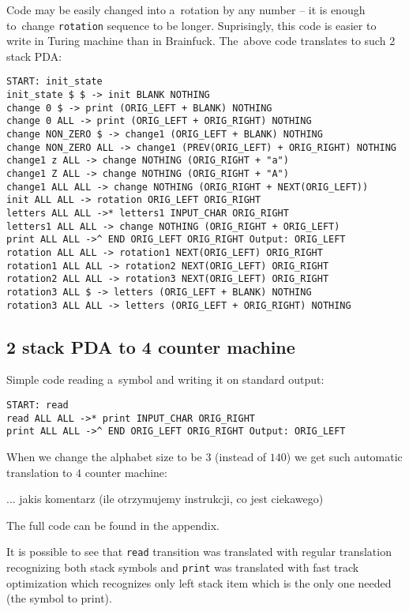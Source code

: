 \documentclass[english,shortabstract,mgr]{iithesis}
\begin{document}
Code may be easily changed into a~rotation by any number -- it is enough
to~change \texttt{rotation} sequence to be longer. Suprisingly, this code
is easier to write in Turing machine than in Brainfuck. The~above code
translates to such 2 stack PDA:

\begin{verbatim}
START: init_state
init_state $ $ -> init BLANK NOTHING
change 0 $ -> print (ORIG_LEFT + BLANK) NOTHING
change 0 ALL -> print (ORIG_LEFT + ORIG_RIGHT) NOTHING
change NON_ZERO $ -> change1 (ORIG_LEFT + BLANK) NOTHING
change NON_ZERO ALL -> change1 (PREV(ORIG_LEFT) + ORIG_RIGHT) NOTHING
change1 z ALL -> change NOTHING (ORIG_RIGHT + "a")
change1 Z ALL -> change NOTHING (ORIG_RIGHT + "A")
change1 ALL ALL -> change NOTHING (ORIG_RIGHT + NEXT(ORIG_LEFT))
init ALL ALL -> rotation ORIG_LEFT ORIG_RIGHT
letters ALL ALL ->* letters1 INPUT_CHAR ORIG_RIGHT
letters1 ALL ALL -> change NOTHING (ORIG_RIGHT + ORIG_LEFT)
print ALL ALL ->^ END ORIG_LEFT ORIG_RIGHT Output: ORIG_LEFT
rotation ALL ALL -> rotation1 NEXT(ORIG_LEFT) ORIG_RIGHT
rotation1 ALL ALL -> rotation2 NEXT(ORIG_LEFT) ORIG_RIGHT
rotation2 ALL ALL -> rotation3 NEXT(ORIG_LEFT) ORIG_RIGHT
rotation3 ALL $ -> letters (ORIG_LEFT + BLANK) NOTHING
rotation3 ALL ALL -> letters (ORIG_LEFT + ORIG_RIGHT) NOTHING
\end{verbatim}

\subsection{2 stack PDA to 4 counter machine}

Simple code reading a~symbol and writing it on standard output:

\begin{verbatim}
START: read
read ALL ALL ->* print INPUT_CHAR ORIG_RIGHT
print ALL ALL ->^ END ORIG_LEFT ORIG_RIGHT Output: ORIG_LEFT
\end{verbatim}

When we change the alphabet size to be $3$ (instead of $140$) we get such
automatic translation to $4$ counter machine:

... jakis komentarz (ile otrzymujemy instrukcji, co jest ciekawego)

The full code can be found in the appendix.

It is possible to see that \texttt{read} transition was translated with
regular translation recognizing both stack symbols and \texttt{print}
was translated with fast track optimization which recognizes only
left stack item which is the only one needed (the symbol to print).
\end{document}
